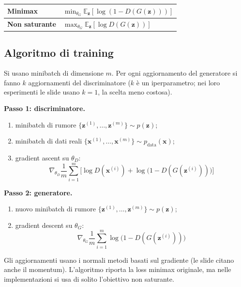 \documentclass[11pt,a4paper]{article}
\providecommand{\E}{\mathbb{E}}
\begin{document}
\begin{center}
\renewcommand{\arraystretch}{1.35}
\begin{tabular}{|p{3.2cm}|p{9.6cm}|}
\hline
\textbf{Minimax} & $\displaystyle\min_{\theta_G}\E_{\mathbf{z}}[\log(1-D(G(\mathbf{z})))]$ \\
\hline
\textbf{Non saturante} & $\displaystyle\max_{\theta_G}\E_{\mathbf{z}}[\log D(G(\mathbf{z}))]$ \\
\hline
\end{tabular}
\end{center}

\subsection{Algoritmo di training}

Si usano minibatch di dimensione $m$. Per ogni aggiornamento del generatore si
fanno $k$ aggiornamenti del discriminatore ($k$ è un iperparametro; nei
loro esperimenti le slide usano $k=1$, la scelta meno costosa).

\textbf{Passo 1: discriminatore.}
\begin{enumerate}
  \item minibatch di rumore $\{\mathbf{z}^{(1)},\dots,\mathbf{z}^{(m)}\}\sim p(\mathbf{z})$;
  \item minibatch di dati reali $\{\mathbf{x}^{(1)},\dots,\mathbf{x}^{(m)}\}\sim p_{\mathrm{data}}(\mathbf{x})$;
  \item gradient ascent su $\theta_D$:
  \[
  \boxed{
  \nabla_{\theta_D}\frac1m\sum_{i=1}^{m}\Big[\log D(\mathbf{x}^{(i)})+\log\big(1-D(G(\mathbf{z}^{(i)}))\big)\Big]
  }
  \]
\end{enumerate}

\textbf{Passo 2: generatore.}
\begin{enumerate}
  \item nuovo minibatch di rumore $\{\mathbf{z}^{(1)},\dots,\mathbf{z}^{(m)}\}\sim p(\mathbf{z})$;
  \item gradient descent su $\theta_G$:
  \[
  \boxed{
  \nabla_{\theta_G}\frac1m\sum_{i=1}^{m}\log\big(1-D(G(\mathbf{z}^{(i)}))\big)
  }
  \]
\end{enumerate}
Gli aggiornamenti usano i normali metodi basati sul gradiente (le slide citano
anche il momentum). L'algoritmo riporta la loss minimax originale, ma nelle
implementazioni si usa di solito l'obiettivo non saturante.
\end{document}
